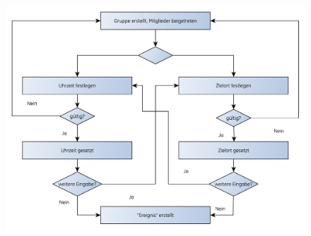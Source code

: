 \begin{figure} [H]
	\centering
	\includegraphics[scale=0.7]{./res/F40_ereignis_erstellen_flowgraph.pdf}
\end{figure}

